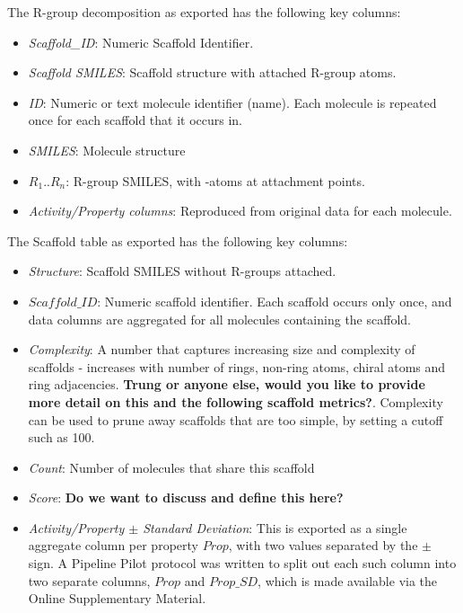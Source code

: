 \documentclass[journal=jacsat,manuscript=article]{achemso}
\begin{document}
The R-group decomposition as exported has the following key columns:
\begin{itemize}
\item {\it Scaffold\_ID}: Numeric Scaffold Identifier.
\item {\it Scaffold SMILES}: Scaffold structure with attached R-group atoms.
\item {\it ID}: Numeric or text molecule identifier (name). Each molecule is repeated once for each scaffold that it occurs in.
\item {\it SMILES}: Molecule structure 
\item {\it $R_1..R_n$}: R-group SMILES, with \*-atoms at attachment points.
\item {\it Activity/Property columns}: Reproduced from original data for each molecule.
\end{itemize}

The Scaffold table as exported has the following key columns:
\begin{itemize}
\item {\it Structure}: Scaffold SMILES without R-groups attached. 
\item {\it $Scaffold\_ID$}: Numeric scaffold identifier. Each scaffold occurs only once, and data columns are aggregated for all molecules containing the scaffold.
\item {\it Complexity}: A number that captures increasing size and complexity of scaffolds - increases with number of rings, non-ring atoms, chiral atoms and ring adjacencies. \textbf{Trung or anyone else, would you like to provide more detail on this and the following scaffold metrics?}. Complexity can be used to prune away scaffolds that are too simple, by setting a cutoff such as 100.  
\item {\it Count}: Number of molecules that share this scaffold
\item {\it Score}: \textbf{Do we want to discuss and define this here?}
\item {\it Activity/Property $\pm$ Standard Deviation}: This is exported as a single aggregate column per property $Prop$, with two values separated by the $\pm$ sign. A Pipeline Pilot protocol was written to split out each such column into two separate columns, $Prop$ and $Prop\_SD$, which is made available via the Online Supplementary Material. 
\end{itemize}
\end{document}
